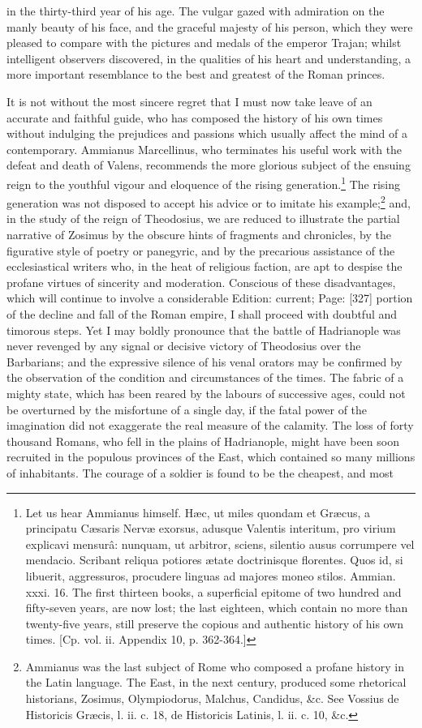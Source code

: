 in the thirty-third year of his age. The vulgar gazed with admiration on the manly beauty of his face, and the graceful majesty of his person, which they were pleased to compare with the pictures and medals of the emperor Trajan; whilst intelligent observers discovered, in the qualities of his heart and understanding, a more important resemblance to the best and greatest of the Roman princes.

It is not without the most sincere regret that I must now take leave of an accurate and faithful guide, who has composed the history of his own times without indulging the prejudices and passions which usually affect the mind of a contemporary. Ammianus Marcellinus, who terminates his useful work with the defeat and death of Valens, recommends the more glorious subject of the ensuing reign to the youthful vigour and eloquence of the rising generation.\footnote{Let us hear Ammianus himself. Hæc, ut miles quondam et Græcus, a principatu Cæsaris Nervæ exorsus, adusque Valentis interitum, pro virium explicavi mensurâ: nunquam, ut arbitror, sciens, silentio ausus corrumpere vel mendacio. Scribant reliqua potiores ætate doctrinisque florentes. Quos id, si libuerit, aggressuros, procudere linguas ad majores moneo stilos. Ammian. xxxi. 16. The first thirteen books, a superficial epitome of two hundred and fifty-seven years, are now lost; the last eighteen, which contain no more than twenty-five years, still preserve the copious and authentic history of his own times. [Cp. vol. ii. Appendix 10, p. 362-364.]} The rising generation was not disposed to accept his advice or to imitate his example;\footnote{Ammianus was the last subject of Rome who composed a profane history in the Latin language. The East, in the next century, produced some rhetorical historians, Zosimus, Olympiodorus, Malchus, Candidus, \&c. See Vossius de Historicis Græcis, l. ii. c. 18, de Historicis Latinis, l. ii. c. 10, \&c.} and, in the study of the reign of Theodosius, we are reduced to illustrate the partial narrative of Zosimus by the obscure hints of fragments and chronicles, by the figurative style of poetry or panegyric, and by the precarious assistance of the ecclesiastical writers who, in the heat of religious faction, are apt to despise the profane virtues of sincerity and moderation. Conscious of these disadvantages, which will continue to involve a considerable Edition: current; Page: [327] portion of the decline and fall of the Roman empire, I shall proceed with doubtful and timorous steps. Yet I may boldly pronounce that the battle of Hadrianople was never revenged by any signal or decisive victory of Theodosius over the Barbarians; and the expressive silence of his venal orators may be confirmed by the observation of the condition and circumstances of the times. The fabric of a mighty state, which has been reared by the labours of successive ages, could not be overturned by the misfortune of a single day, if the fatal power of the imagination did not exaggerate the real measure of the calamity. The loss of forty thousand Romans, who fell in the plains of Hadrianople, might have been soon recruited in the populous provinces of the East, which contained so many millions of inhabitants. The courage of a soldier is found to be the cheapest, and most 